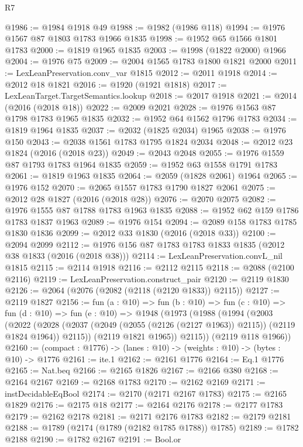 \begin{lexlean}{R7}
\begin{coremodule}
@1986 := @1984 @1918 @49
@1988 := @1982 (@1986 @118)
@1994 := @1976 @1567 @87 @1803 @1783 @1966 @1835
@1998 := @1952 @65 @1566 @1801 @1783
@2000 := @1819 @1965 @1835
@2003 := @1998 (@1822 @2000) @1966
@2004 := @1976 @75
@2009 := @2004 @1565 @1783 @1800 @1821 @2000
@2011 := LexLeanPreservation.conv_var @1815
@2012 := @2011 @1918
@2014 := @2012 @18 @1821
@2016 := @1920 (@1921 @1818)
@2017 := LexLeanTarget.TargetSemantics.lookup
@2018 := @2017 @1918
@2021 := @2014 (@2016 (@2018 @18))
@2022 := @2009 @2021
@2028 := @1976 @1563 @87 @1798 @1783 @1965 @1835
@2032 := @1952 @64 @1562 @1796 @1783
@2034 := @1819 @1964 @1835
@2037 := @2032 (@1825 @2034) @1965
@2038 := @1976 @150
@2043 := @2038 @1561 @1783 @1795 @1824 @2034
@2048 := @2012 @23 @1824 (@2016 (@2018 @23))
@2049 := @2043 @2048
@2055 := @1976 @1559 @87 @1793 @1783 @1964 @1835
@2059 := @1952 @63 @1558 @1791 @1783
@2061 := @1819 @1963 @1835
@2064 := @2059 (@1828 @2061) @1964
@2065 := @1976 @152
@2070 := @2065 @1557 @1783 @1790 @1827 @2061
@2075 := @2012 @28 @1827 (@2016 (@2018 @28))
@2076 := @2070 @2075
@2082 := @1976 @1555 @87 @1788 @1783 @1963 @1835
@2088 := @1952 @62 @159 @1786 @1783 @1837 @1963
@2089 := @1976 @154
@2094 := @2089 @158 @1783 @1785 @1830 @1836
@2099 := @2012 @33 @1830 (@2016 (@2018 @33))
@2100 := @2094 @2099
@2112 := @1976 @156 @87 @1783 @1783 @1833 @1835 (@2012 @38 @1833 (@2016 (@2018 @38)))
@2114 := LexLeanPreservation.convL_nil @1815
@2115 := @2114 @1918
@2116 := @2112 @2115
@2118 := @2088 (@2100 @2116)
@2119 := LexLeanPreservation.construct_pair
@2120 := @2119 @1830
@2126 := @2064 (@2076 (@2082 (@2118 (@2120 @1833)) @2115))
@2127 := @2119 @1827
@2156 := fun (a : @10) =>
  fun (b : @10) =>
  fun (c : @10) =>
  fun (d : @10) =>
  fun (e : @10) =>
  @1948
    (@1973
      (@1988
        (@1994
          (@2003
            (@2022
              (@2028 (@2037 (@2049 (@2055 (@2126 (@2127 @1963)) @2115)) (@2119 @1824 @1964)) @2115))
            (@2119 @1821 @1965))
          @2115))
      (@2119 @118 @1966))
@2160 := (compact : @1776) -> (lanes : @10) -> (weights : @10) -> (bytes : @10) -> @1776
@2161 := ite.{1}
@2162 := @2161 @1776
@2164 := Eq.{1} @1776
@2165 := Nat.beq
@2166 := @2165 @1826
@2167 := @2166 @380
@2168 := @2164 @2167
@2169 := @2168 @1783
@2170 := @2162 @2169
@2171 := instDecidableEqBool
@2174 := @2170 (@2171 @2167 @1783)
@2175 := @2165 @1829
@2176 := @2175 @18
@2177 := @2164 @2176
@2178 := @2177 @1783
@2179 := @2162 @2178
@2181 := @2171 @2176 @1783
@2182 := @2179 @2181
@2188 := @1789 (@2174 (@1789 (@2182 @1785 @1788)) @1785)
@2189 := @1782 @2188
@2190 := @1782 @2167
@2191 := Bool.or

\end{coremodule}
\end{lexlean}
